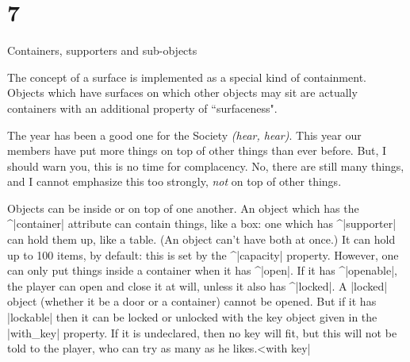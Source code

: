 {{\newpage
\section{7}{Containers, supporters and sub-objects}

\quote
The concept of a surface is implemented as a special kind of containment.
Objects which have surfaces on which other objects may sit are actually
containers with an additional property of ``surfaceness".

\widequote
The year has been a good one for the Society {\sl (hear, hear)}.
This year our members have put more things on top of other things
than ever before.  But, I should warn you, this is no time for
complacency.  No, there are still many things, and I cannot
emphasize this too strongly, {\sl not} on top of other things.

\noindent
Objects can be inside or on top of one another.  An object which has the
^|container| attribute can contain things, like a box: one which has
^|supporter| can hold them up, like a table.  (An object can't have both at
once.)  It can hold up to 100 items, by default: this is set by the ^|capacity|
property.
However, one can only put things inside a container when it has ^|open|.
If it has ^|openable|, the player can open and close it at will, unless
it also has ^|locked|.  A |locked| object (whether it be a door or a
container) cannot be opened.  But if it has |lockable| then it can be
locked or unlocked with the key object given in the |with_key| property.
If it is undeclared, then no key will fit, but this will not be told
to the player, who can try as many as he likes.^^|with key|

}}

